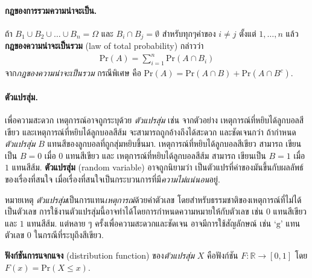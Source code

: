 \paragraph{กฎของการรวมความน่าจะเป็น.}
ถ้า $B_1 \cup B_2 \cup \ldots \cup B_n = \Omega$
และ $B_i \cap B_j = \emptyset$ สำหรับทุกๆค่าของ $i \neq j$ ตั้งแต่ $1, \ldots, n$
แล้ว
\textbf{กฎของความน่าจะเป็นรวม} (law of total probability)
กล่าวว่า
\begin{eqnarray}
\mathrm{Pr}(A) = \sum_{i=1}^n \mathrm{Pr}(A \cap B_i)
\label{eq: prob law of total prob}
\end{eqnarray}
จาก\textit{กฎของความน่าจะเป็นรวม}
กรณีพิเศษ คือ $\mathrm{Pr}(A) = \mathrm{Pr}(A \cap B) + \mathrm{Pr}(A \cap B^c)$.

\paragraph{ตัวแปรสุ่ม.}
เพื่อความสะดวก
เหตุการณ์อาจถูกระบุด้วย
\textit{ตัวแปรสุ่ม} 
เช่น จากตัวอย่าง
เหตุการณ์ที่หยิบได้ลูกบอลสีเขียว
และเหตุการณ์ที่หยิบได้ลูกบอลสีส้ม
จะสามารถถูกอ้างถึงได้สะดวก และชัดเจนกว่า
ถ้ากำหนด \textit{ตัวแปรสุ่ม} $B$ แทนสีของลูกบอลที่ถูกสุ่มหยิบขึ้นมา.
เหตุการณ์ที่หยิบได้ลูกบอลสีเขียว 
สามารถ เขียนเป็น $B = 0$
เมื่อ $0$ แทนสีเขียว %
และ 
เหตุการณ์ที่หยิบได้ลูกบอลสีส้ม 
สามารถ เขียนเป็น $B = 1$
เมื่อ $1$ แทนสีส้ม.
\textbf{ตัวแปรสุ่ม} (random variable)
อาจถูกนิยามว่า
เป็นตัวแปรที่ค่าของมันขึ้นกับผลลัพธ์ของเรื่องที่สนใจ เมื่อเรื่องที่สนใจเป็นกระบวนการที่มี\textit{ความไม่แน่นอน}อยู่.

หมายเหตุ \textit{ตัวแปรสุ่ม}เป็นการแทน\textit{เหตุการณ์}ด้วยค่าตัวเลข
โดยสำหรับธรรมชาติของเหตุการณ์ที่ไม่ได้เป็นตัวเลข การใช้งานตัวแปรสุ่มนี้อาจทำได้โดยการกำหนดความหมายให้กับตัวเลข 
เช่น $0$ แทนสีเขียว และ $1$ แทนสีส้ม.
แต่หลาย ๆ ครั้งเพื่อความสะดวกและชัดเจน
อาจมีการใช้สัญลักษณ์ เช่น
$\mbox{`g'}$ แทนตัวเลข $0$ ในกรณีที่ระบุถึงสีเขียว.

\textbf{ฟังก์ชันการแจกแจง} (distribution function)
	ของ\textit{ตัวแปรสุ่ม} $X$
คือฟังก์ชัน 
$F: \mathbb{R} \rightarrow [0,1]$ 
โดย
$F(x) = \mathrm{Pr}(X \leq x)$.

